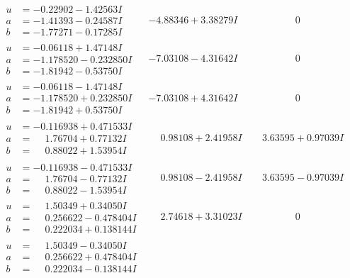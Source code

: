 \documentclass[1p]{elsarticle_modified}
\theoremstyle{definition}
\begin{document}
$$\begin{array}{c|c|c}
\begin{aligned}
u &= -0.22902 - 1.42563 I \\
a &= -1.41393 - 0.24587 I \\
b &= -1.77271 - 0.17285 I\end{aligned}
 & -4.88346 + 3.38279 I & \phantom{-0.000000 } 0 \\ \hline\begin{aligned}
u &= -0.06118 + 1.47148 I \\
a &= -1.178520 - 0.232850 I \\
b &= -1.81942 - 0.53750 I\end{aligned}
 & -7.03108 - 4.31642 I & \phantom{-0.000000 } 0 \\ \hline\begin{aligned}
u &= -0.06118 - 1.47148 I \\
a &= -1.178520 + 0.232850 I \\
b &= -1.81942 + 0.53750 I\end{aligned}
 & -7.03108 + 4.31642 I & \phantom{-0.000000 } 0 \\ \hline\begin{aligned}
u &= -0.116938 + 0.471533 I \\
a &= \phantom{-}1.76704 + 0.77132 I \\
b &= \phantom{-}0.88022 + 1.53954 I\end{aligned}
 & \phantom{-}0.98108 + 2.41958 I & \phantom{-}3.63595 + 0.97039 I \\ \hline\begin{aligned}
u &= -0.116938 - 0.471533 I \\
a &= \phantom{-}1.76704 - 0.77132 I \\
b &= \phantom{-}0.88022 - 1.53954 I\end{aligned}
 & \phantom{-}0.98108 - 2.41958 I & \phantom{-}3.63595 - 0.97039 I \\ \hline\begin{aligned}
u &= \phantom{-}1.50349 + 0.34050 I \\
a &= \phantom{-}0.256622 - 0.478404 I \\
b &= \phantom{-}0.222034 + 0.138144 I\end{aligned}
 & \phantom{-}2.74618 + 3.31023 I & \phantom{-0.000000 } 0 \\ \hline\begin{aligned}
u &= \phantom{-}1.50349 - 0.34050 I \\
a &= \phantom{-}0.256622 + 0.478404 I \\
b &= \phantom{-}0.222034 - 0.138144 I\end{aligned}

\end{array}$$
\end{document}
